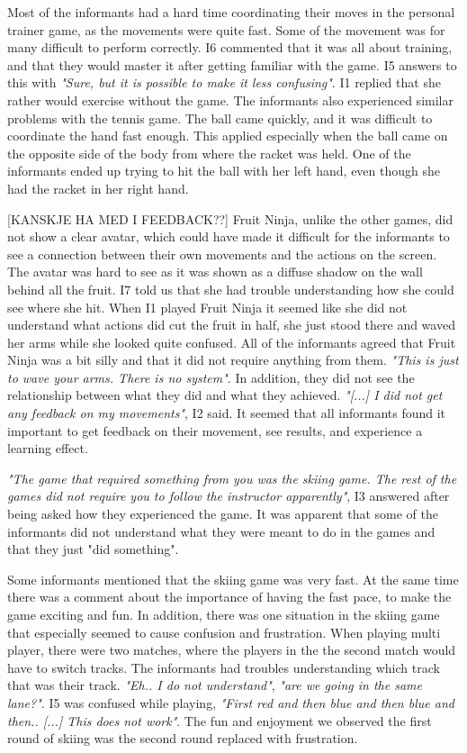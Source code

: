 Most of the informants had a hard time coordinating their moves in the personal trainer game, as the movements were quite fast. Some of the movement was for many difficult to perform correctly. I6 commented that it was all about training, and that they would master it after getting familiar with the game. I5 answers to this with \emph{"Sure, but it is possible to make it less confusing"}. I1 replied that she rather would exercise without the game. The informants also experienced similar problems with the tennis game. The ball came quickly, and it was difficult to coordinate the hand fast enough. This applied especially when the ball came on the opposite side of the body from where the racket was held. One of the informants ended up trying to hit the ball with her left hand, even though she had the racket in her right hand. 

[KANSKJE HA MED I FEEDBACK??] Fruit Ninja, unlike the other games, did not show a clear avatar, which could have made it difficult for the informants to see a connection between their own movements and the actions on the screen. The avatar was hard to see as it was shown as a diffuse shadow on the wall behind all the fruit. I7 told us that she had trouble understanding how she could see where she hit. When I1 played Fruit Ninja it seemed like she did not understand what actions did cut the fruit in half, she just stood there and waved her arms while she looked quite confused. All of the informants agreed that Fruit Ninja was a bit silly and that it did not require anything from them. \emph{"This is just to wave your arms. There is no system"}. In addition, they did not see the relationship between what they did and what they achieved. \emph{"[...] I did not get any feedback on my movements"}, I2 said. It seemed that all informants found it important to get feedback on their movement, see results, and experience a learning effect.

\emph{"The game that required something from you was the skiing game. The rest of the games did not require you to follow the instructor apparently"}, I3 answered after being asked how they experienced the game. It was apparent that some of the informants did not understand what they were meant to do in the games and that they just "did something". 

Some informants mentioned that the skiing game was very fast. At the same time there was a comment about the importance of having the fast pace, to make the game exciting and fun. In addition, there was one situation in the skiing game that especially seemed to cause confusion and frustration. When playing multi player, there were two matches, where the players in the the second match would have to switch tracks. The informants had troubles understanding which track that was their track. \emph{"Eh.. I do not understand"}, \emph{"are we going in the same lane?"}. I5 was confused while playing, \emph{"First red and then blue and then blue and then.. [...] This does not work"}. The fun and enjoyment we observed the first round of skiing was the second round replaced with frustration. 

